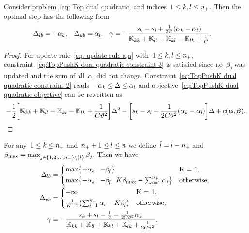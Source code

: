 \begin{lemma}
  Consider problem~\ref{eq: Top dual quadratic} and indices~$1\le k, l \le n_{+}.$ Then the optimal step has the following form
  \begin{align*}
    \Delta_{lb} & = -\alpha_k, &
    \Delta_{ub} & = \alpha_l, &
    \gamma & = -\frac{s_k - s_l + \frac{1}{2C}(\alpha_k - \alpha_l)}{\mathbb{K}_{kk} + \mathbb{K}_{ll} - \mathbb{K}_{kl} - \mathbb{K}_{lk} + \frac{1}{C}}.
  \end{align*}
\end{lemma}

\begin{proof}
  For update rule~\eqref{eq: update rule a,a} with~$1\le k, l \le n_{+}$, constraint~\eqref{eq:TopPushK dual quadratic constraint 3} is satisfied since no~$\beta_j$ was updated and the sum of all~$\alpha_i$ did not change. Constraint~\eqref{eq:TopPushK dual quadratic constraint 2} reads~$-\alpha_k \leq \Delta \leq \alpha_l$ and objective~\eqref{eq:TopPushK dual quadratic objective} can be rewritten as
    \begin{equation*}
      - \frac{1}{2} \Brac[s]{\K_{kk} + \K_{ll} - \K_{kl} - \K_{lk} + \frac{1}{C\vartheta^2}} \Delta^2 - \Brac[s]{s_k - s_l + \frac{1}{2C\vartheta^2}(\alphak - \alphal)} \Delta + c(\bm{\alpha}, \bm{\beta}).
    \end{equation*}
\end{proof}

\begin{lemma}
  For any~$1 \le k \le n_{+}$ and~$n_{+} + 1 \le l \le n$ we define~$\hat{l} = l - n_{+}$  and~$\beta_{\max} = \max_{j \in \{1, 2, \ldots, n_{-} \} \setminus \{\hat l\}} \beta_j.$ Then we have
  \begin{align*}
    \Delta_{lb} & = 
      \begin{cases*}
        \max \Brac[c]{- \alphak,\;  -\betal} & K = 1, \\
        \max \Brac[c]{- \alphak,\;  -\betal, \; K\beta_{\max} - \sum_{i = 1}^{\npos} \alpha_i} & \textrm{otherwise},
      \end{cases*} \\
    \Delta_{ub} & = 
      \begin{cases*}
        + \infty & K = 1, \\
        \frac{1}{K-1}\Brac{\sum_{i = 1}^{\npos} \alpha_i - K \betal} & \textrm{otherwise},
      \end{cases*} \\
    \gamma & = -\frac{s_k + s_l - \frac{1}{\vartheta} + \frac{1}{2C\vartheta^2} \alphak}{\K_{kk} + \K_{ll} + \K_{kl} + \K_{lk} + \frac{1}{2C\vartheta^2}}.
  \end{align*}
\end{lemma}

